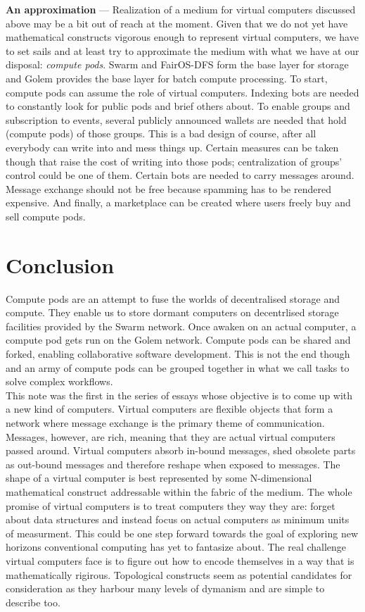 \documentclass[a4paper, 10pt]{article}
\begin{document}
\textbf{An approximation} --- Realization of a medium for virtual computers discussed above may be a bit out of reach at the moment. Given that we do not yet have mathematical constructs vigorous enough to represent virtual computers, we have to set sails and at least try to approximate the medium with what we have at our disposal: \textit{compute pods}. Swarm and FairOS-DFS form the base layer for storage and Golem provides the base layer for batch compute processing. To start, compute pods can assume the role of virtual computers. Indexing bots are needed to constantly look for public pods and brief others about. To enable groups and subscription to events, several publicly announced wallets are needed that hold (compute pods) of those groups. This is a bad design of course, after all everybody can write into and mess things up. Certain measures can be taken though that raise the cost of writing into those pods; centralization of groups' control could be one of them. Certain bots are needed to carry messages around. Message exchange should not be free because spamming has to be rendered expensive. And finally, a marketplace can be created where users freely buy and sell compute pods.

\section*{Conclusion}
Compute pods are an attempt to fuse the worlds of decentralised storage and compute. They enable us to store dormant computers on decentrlised storage facilities provided by the Swarm network. Once awaken on an actual computer, a compute pod gets run on the Golem network. Compute pods can be shared and forked, enabling collaborative software development. This is not the end though and an army of compute pods can be grouped together in what we call tasks to solve complex workflows.\\
This note was the first in the series of essays whose objective is to come up with a new kind of computers. Virtual computers are flexible objects that form a network where message exchange is the primary theme of communication. Messages, however, are rich, meaning that they are actual virtual computers passed around. Virtual computers absorb in-bound messages, shed obsolete parts as out-bound messages and therefore reshape when exposed to messages. The shape of a virtual computer is best represented by some N-dimensional mathematical construct addressable within the fabric of the medium. The whole promise of virtual computers is to treat computers they way they are: forget about data structures and instead focus on actual computers as minimum units of measurment. This could be one step forward towards the goal of exploring new horizons conventional computing has yet to fantasize about. The real challenge virtual computers face is to figure out how to encode themselves in a way that is mathematically rigirous. Topological constructs seem as potential candidates for consideration as they harbour many levels of dymanism and are simple to describe too.



\end{document}

